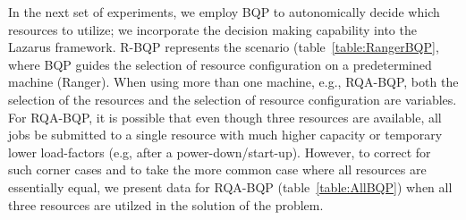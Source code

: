 \documentclass{acm_proc_article-sp}
\begin{document}
In the next set of experiments, we employ BQP to autonomically decide which resources to utilize; we incorporate 
the decision making capability into the Lazarus framework.  R-BQP represents the scenario 
(table~\ref{table:RangerBQP}, where BQP 
guides the selection of resource configuration on a predetermined machine (Ranger).  When using more than one 
machine, e.g., RQA-BQP, %
both the selection of the resources and the selection of resource configuration are variables. For RQA-BQP, it is 
possible that even though three resources are available, all jobs be submitted to a single resource with much 
higher capacity or temporary lower load-factors (e.g, after a power-down/start-up). However, to correct for such 
corner cases and to take the more common case where all resources are essentially equal, we present data for 
RQA-BQP (table~\ref{table:AllBQP}) when all three resources are utilzed in the solution of the problem.

\begin{table}
\begin{center}
\caption{Table showing  the selected configuration of the resources
  and the numer of times a particular configuration is chosen, when 
  the decision is guided by BzaQP. Data in this table corresponds to
  RQA-BQP; the experiments are repeated ten times. As can be seen, 
  the use of BQP results in a varying choice of resource  configuration on  different machines.  In contrast, when BQP is not used, a fixed configuration
  is employed.}
\label{table:AllBQP}
\end{center}
\end{table}
\end{document}
